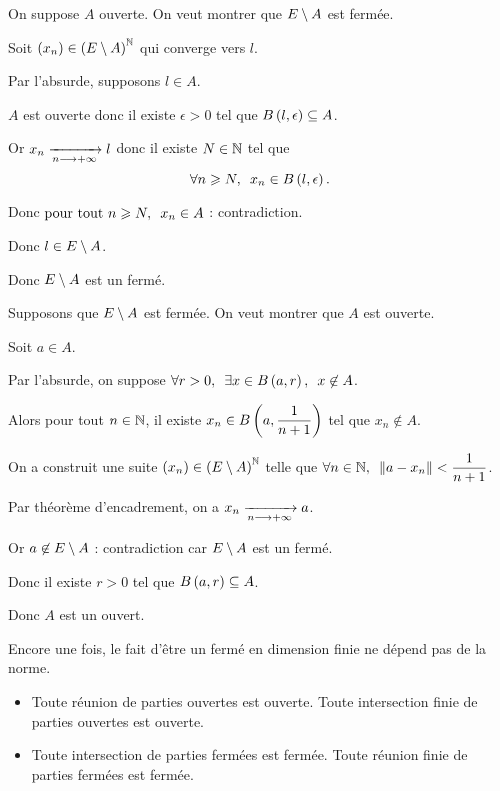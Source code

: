\begin{dem}
\impdir

On suppose \(A\) ouverte. On veut montrer que \(E\setminus A\) est fermée.

Soit \(\left(x_n\right)\in\left(E\setminus A\right)^{\mathbb{N}}\) qui converge vers \(l\).

Par l'absurde, supposons \(l\in A\).

\(A\) est ouverte donc il existe \(\epsilon>0\) tel que \(\bouleo{l}{\epsilon}\subset A\).

Or \(x_n\xrightarrow[n\longrightarrow+\infty]{}l\) donc il existe \(N\in\mathbb{N}\) tel que \[\quantifs{\forall n\geq N}x_n\in\bouleo{l}{\epsilon}.\]

Donc \(\quantifs{\tpt n\geq N}x_n\in A\) : contradiction.

Donc \(l\in E\setminus A\).

Donc \(E\setminus A\) est un fermé.

\imprec

Supposons que \(E\setminus A\) est fermée. On veut montrer que \(A\) est ouverte.

Soit \(a\in A\).

Par l'absurde, on suppose \(\quantifs{\forall r>0;\exists x\in\bouleo{a}{r}}x\not\in A\).

Alors pour tout \(n\in\mathbb{N}\), il existe \(x_n\in\bouleo{a}{\dfrac{1}{n+1}}\) tel que \(x_n\not\in A\).

On a construit une suite \(\left(x_n\right)\in\left(E\setminus A\right)^{\mathbb{N}}\) telle que \(\quantifs{\forall n\in\N}\norme{a-x_n}<\dfrac{1}{n+1}\).

Par théorème d'encadrement, on a \(x_n\xrightarrow[n\longrightarrow+\infty]{}a\).

Or \(a\not\in E\setminus A\) : contradiction car \(E\setminus A\) est un fermé.

Donc il existe \(r>0\) tel que \(\bouleo{a}{r}\subset A\).

Donc \(A\) est un ouvert.
\end{dem}

Encore une fois, le fait d'être un fermé en dimension finie ne dépend pas de la norme.

\begin{prop}
\begin{itemize}
    \item Toute réunion de parties ouvertes est ouverte. Toute intersection finie de parties ouvertes est ouverte. \\
    \item Toute intersection de parties fermées est fermée. Toute réunion finie de parties fermées est fermée.
\end{itemize}
\end{prop}

